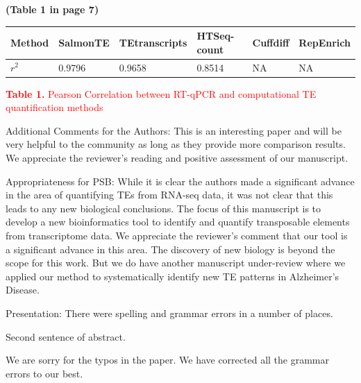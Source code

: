 \documentclass[10pt]{article}
\begin{document}
\begin{response}
\noindent\textbf{(Table 1 in page 7)}
\begin{table}[h]
\begin{center}
\begin{tabular}{l|lllll}
	\hline
	Method    & SalmonTE & TEtranscripts & HTSeq-count & Cuffdiff & RepEnrich  \\ \hline
	 $r^2$ & 0.9796 & 0.9658 & 0.8514 & NA & NA \\ \hline
\end{tabular}
\end{center}
\end{table}
\begin{center}
\textcolor{red}{
\noindent\textbf{Table 1.} Pearson Correlation between RT-qPCR and computational TE quantification methods}
\end{center}


\end{response}

\begin{response}{Additional Comments for the Authors: This is an interesting paper and will be very helpful to the community as long as they provide more comparison results.}
We appreciate the reviewer's reading and positive assessment of our manuscript.
\end{response}


\begin{response}{Appropriateness for PSB: While it is clear the authors made a significant advance in the area of quantifying TEs from RNA-seq data, it was not clear that this leads to any new biological conclusions.}
The focus of this manuscript is to develop a new bioinformatics tool to identify and quantify transposable elements from 
transcriptome data.  We appreciate the reviewer's comment that our tool is a significant advance in this area.  The discovery of new biology is beyond the scope for this work. But we do have another manuscript under-review where we applied our method to systematically identify new TE patterns in Alzheimer's Disease.
\end{response}


\begin{response}{Presentation: There were spelling and grammar errors in a number of places.

Second sentence of abstract. 
}
We are sorry for the typos in the paper.  We have corrected all the grammar errors to our best. 
\end{response}
\end{document}
